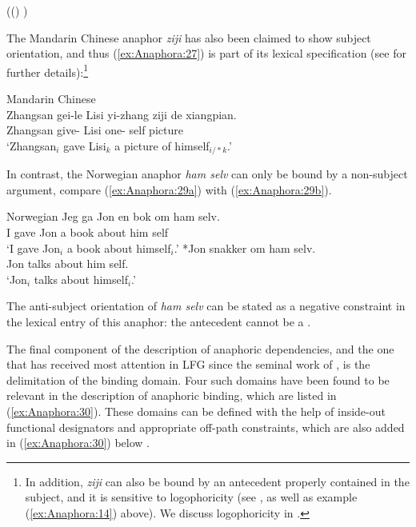 \documentclass[output=paper,hidelinks]{langscibook}
\begin{document}
\ea\label{ex:Anaphora:27} ((\GF* \GFPRO\UP)  \SUBJ )
\z

\noindent The Mandarin Chinese anaphor \textit{ziji} has also been claimed to show subject orientation, and thus (\ref{ex:Anaphora:27}) is part of its lexical specification (see \citealt{Lam2021-rq} for further details):\footnote{In addition, \textit{ziji} can also be bound by an antecedent properly contained in the subject, and it is sensitive to logophoricity (see \citealt{Lam2021-rq}, as well as example (\ref{ex:Anaphora:14}) above). We discuss logophoricity in .}

\ea\label{ex:Anaphora:28} Mandarin Chinese \citep[296]{10.2307/20100748}\\
\gll
Zhangsan  gei-le      Lisi  yi-zhang  ziji   de  xiangpian.\\
Zhangsan give-{\ASP} Lisi    one- self        picture\\
\glt`Zhangsan$_i$  gave Lisi$_k$ a picture of himself$_{i/*k}$.'
\z
 
\noindent In contrast, the Norwegian anaphor \textit{ham selv} can only be bound by a non-subject argument, compare (\ref{ex:Anaphora:29a}) with (\ref{ex:Anaphora:29b}).

\ea\label{ex:Anaphora:29} Norwegian \citep[29--30]{dalrymple1993}
\ea\label{ex:Anaphora:29a}\gll
Jeg ga    Jon en bok    om     ham selv.\\
 I    gave Jon a    book about  him self\\
 \glt`I gave Jon$_i$ a book about himself$_i$.'
\ex\label{ex:Anaphora:29b}\gll
  *Jon snakker om      ham selv.\\
 Jon  talks      about  him  self.\\
 \glt`Jon$_i$ talks about himself$_i$.'
\z\z

\noindent The anti-subject orientation of \emph{ham selv} can be stated as a negative constraint in the lexical entry of this anaphor: the antecedent cannot be a \SUBJ.

The final component of the description of anaphoric dependencies, and the one that has received most attention in LFG since the seminal work of \citet{dalrymple1993}, is the delimitation of the binding domain. Four such domains have been found to be relevant in the description of anaphoric binding, which are listed in (\ref{ex:Anaphora:30}). These domains can be defined with the help of inside-out functional designators and appropriate off-path constraints, which are also added in (\ref{ex:Anaphora:30}) below \citep[507]{DLM:LFG}.
\end{document}
